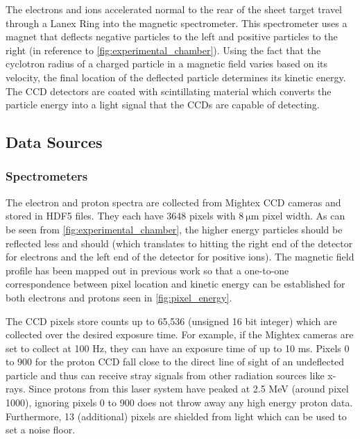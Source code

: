 The electrons and ions accelerated normal to the rear of the sheet target travel through a Lanex Ring into the magnetic spectrometer. This spectrometer uses a magnet that deflects negative particles to the left and positive particles to the right (in reference to \autoref{fig:experimental_chamber}). Using the fact that the cyclotron radius of a charged particle in a magnetic field varies based on its velocity, the final location of the deflected particle determines its kinetic energy. The \gls{CCD} detectors are coated with scintillating material which converts the particle energy into a light signal that the \gls{CCD}s are capable of detecting.  

\subsection{Data Sources} \label{sec:data_sources}
\subsubsection{Spectrometers}

The electron and proton spectra are collected from Mightex \gls{CCD} cameras and stored in \gls{HDF5} files. They each have 3648 pixels with $\SI{8}{\micro \meter}$ pixel width. As can be seen from \autoref{fig:experimental_chamber}, the higher energy particles should be reflected less and should (which translates to hitting the right end of the detector for electrons and the left end of the detector for positive ions). The magnetic field profile has been mapped out in previous work \cite{Morrison_2018_NJoP} so that a one-to-one correspondence between pixel location and kinetic energy can be established for both electrons and protons seen in \autoref{fig:pixel_energy}. 

The CCD pixels store counts up to 65,536 (unsigned 16 bit integer) which are collected over the desired exposure time. For example, if the Mightex cameras are set to collect at 100 Hz, they can have an exposure time of up to 10 ms. Pixels 0 to 900 for the proton CCD fall close to the direct line of sight of an undeflected particle and thus can receive stray signals from other radiation sources like x-rays. Since protons from this laser system have peaked at 2.5 MeV \cite{Morrison_2018_NJoP} (around pixel 1000), ignoring pixels 0 to 900 does not throw away any high energy proton data. Furthermore, 13 (additional) pixels are shielded from light which can be used to set a noise floor.


